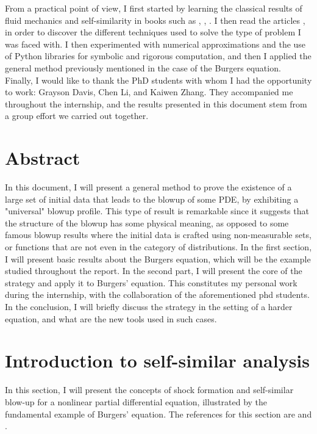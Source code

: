 \documentclass[11pt,a4paper]{article}
\begin{document}
\hspace*{2em} From a practical point of view, I first started by learning the classical results of fluid mechanics and self-similarity in books such as \cite{majda2001vorticity}, \cite{eggers2015singularities}, \cite{tao2006dispersive}. I then read the articles \cite{buckmaster2019formation}, \cite{buckmaster2022imploding} in order to discover the different techniques used to solve the type of problem I was faced with. I then experimented with numerical approximations and the use of Python libraries for symbolic and rigorous computation, and then I applied the general method previously mentioned in the case of the Burgers equation. \\

\hspace*{2em} Finally, I would like to thank the PhD students with whom I had the opportunity to work: Grayson Davis, Chen Li, and Kaiwen Zhang. They accompanied me throughout the internship, and the results presented in this document stem from a group effort we carried out together.
\newpage
\tableofcontents
\newpage
{\centering\section*{Abstract}}
\hspace*{2em} In this document, I will present a general method to prove the existence of a large set of initial data that leads to the blowup of some PDE, by exhibiting a "universal" blowup profile. This type of result is remarkable since it suggests that the structure of the blowup has some physical meaning, as opposed to some famous blowup results where the initial data is crafted using non-measurable sets, or functions that are not even in the category of distributions.
In the first section, I will present basic results about the Burgers equation, which will be the example studied throughout the report. In the second part, I will present the core of the strategy and apply it to Burgers' equation. This constitutes my personal work during the internship, with the collaboration of the aforementioned phd students. In the conclusion, I will briefly discuss the strategy in the setting of a harder equation, and what are the new tools used in such cases. \\


\section{Introduction to self-similar analysis}
\hspace*{2em} In this section, I will present the concepts of shock formation and self-similar blow-up for a nonlinear partial differential equation, illustrated by the fundamental example of Burgers' equation. The references for this section are  \cite{majda2001vorticity} and \cite{eggers2015singularities}.
\end{document}
